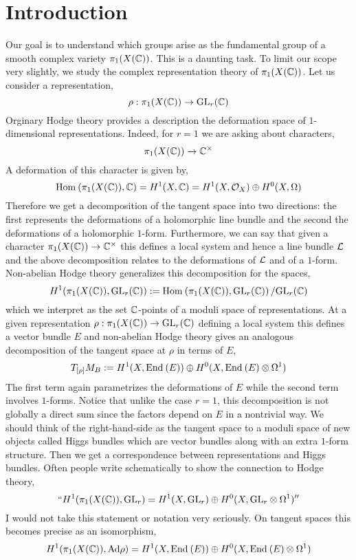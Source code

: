 \documentclass[12pt]{article}
\begin{document}
\newcommand{\Ad}{\mathrm{Ad}}
\newcommand{\gl}{\mathfrak{gl}}
\newcommand{\Hod}{\mathrm{Hod}}

\section{Introduction}
Our goal is to understand which groups arise as the fundamental group of a smooth complex variety $\pi_1(X(\mathbb{C}))$. This is a daunting task. To limit our scope very slightly, we study the complex representation theory of $\pi_1(X(\mathbb{C}))$. 
Let us consider a representation,
\[ \rho : \pi_1(X(\mathbb{C})) \to \mathrm{GL}_r(\mathbb{C}) \]
Orginary Hodge theory provides a description the deformation space of $1$-dimensional representations. Indeed, for $r = 1$ we are asking about characters,
\[ \pi_1(X(\mathbb{C})) \to \mathbb{C}^\times \]
A deformation of this character is given by,
\[ \mathrm{Hom}_{} \left( \pi_1(X(\mathbb{C})), \mathbb{C} \right) = H^1(X, \mathbb{C}) = H^1(X, \mathcal{O}_{X}) \oplus H^0(X, \Omega) \]
Therefore we get a decomposition of the tangent space into two directions: the first represents the deformations of a holomorphic line bundle and the second the deformations of a holomorphic $1$-form. Furthermore, we can say that given a character $\pi_1(X(\mathbb{C})) \to \mathbb{C}^\times$ this defines a local system and hence a line bundle $\mathcal{L}$ and the above decomposition relates to the deformations of $\mathcal{L}$ and of a $1$-form. 
\bigskip\\
Non-abelian Hodge theory generalizes this decomposition for the spaces,
\[ H^1(\pi_1(X(\mathbb{C})), \mathrm{GL}_r(\mathbb{C})) := \mathrm{Hom}_{} \left( \pi_1(X(\mathbb{C})), \mathrm{GL}_r(\mathbb{C}) \right) / \mathrm{GL}_r(\mathbb{C}) \]
which we interpret as the set $\mathbb{C}$-points of a moduli space of representations. At a given representation $\rho : \pi_1(X(\mathbb{C})) \to \mathrm{GL}_r(\mathbb{C})$ defining a local system this defines a vector bundle $E$ and non-abelian Hodge theory gives an analogous decomposition of the tangent space at $\rho$ in terms of $E$,
\[ T_{[\rho]} M_B :=  H^1(X, \mathrm{End}_{} \left( E \right)) \oplus H^0(X, \mathrm{End}_{} \left( E \right) \otimes \Omega^1) \]
The first term again parametrizes the deformations of $E$ while the second term involves $1$-forms.
Notice that unlike the case $r = 1$, this decomposition is not globally a direct sum since the factors depend on $E$ in a nontrivial way. We should think of the right-hand-side as the tangent space to a moduli space of new objects called Higgs bundles which are vector bundles along with an extra $1$-form structure. Then we get a correspondence between representations and Higgs bundles. Often people write schematically to show the connection to Hodge theory,
\[ ``H^1(\pi_1(X(\mathbb{C})), \mathrm{GL}_r) =  H^1(X, \mathrm{GL}_r) \oplus H^0(X, \mathrm{GL}_r \otimes \Omega^1)'' \]
I would not take this statement or notation very seriously. On tangent spaces this becomes precise as an isomorphism,
\[ H^1(\pi_1(X(\CC)), \Ad{\rho}) = H^1(X, \End{E}) \oplus H^0(X, \End{E} \ot \Omega^1) \]
\end{document}

